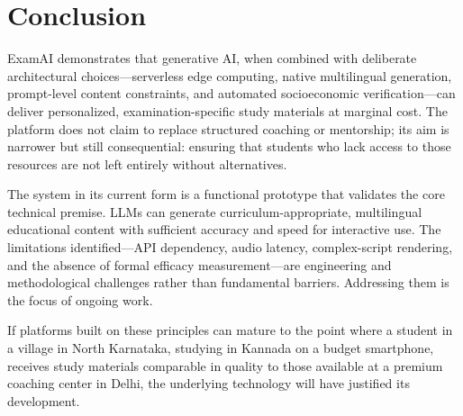 \documentclass[conference]{IEEEtran}
\begin{document}
\section{Conclusion}

ExamAI demonstrates that generative AI, when combined with deliberate architectural choices---serverless edge computing, native multilingual generation, prompt-level content constraints, and automated socioeconomic verification---can deliver personalized, examination-specific study materials at marginal cost. The platform does not claim to replace structured coaching or mentorship; its aim is narrower but still consequential: ensuring that students who lack access to those resources are not left entirely without alternatives.

The system in its current form is a functional prototype that validates the core technical premise. LLMs can generate curriculum-appropriate, multilingual educational content with sufficient accuracy and speed for interactive use. The limitations identified---API dependency, audio latency, complex-script rendering, and the absence of formal efficacy measurement---are engineering and methodological challenges rather than fundamental barriers. Addressing them is the focus of ongoing work.

If platforms built on these principles can mature to the point where a student in a village in North Karnataka, studying in Kannada on a budget smartphone, receives study materials comparable in quality to those available at a premium coaching center in Delhi, the underlying technology will have justified its development.
\end{document}
